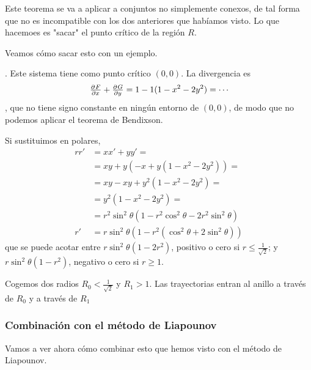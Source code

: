 Este teorema se va a aplicar a conjuntos no simplemente conexos, de tal forma que no es incompatible con los dos anteriores que habíamos visto. Lo que hacemoes es "sacar" el punto crítico de la región $R$.

Veamos cómo sacar esto con un ejemplo.

\begin{example}
. Este sistema tiene como punto crítico $(0,0)$. La divergencia es \[ \pd{F}{x} + \pd{G}{y} = 1 - 1(1-x^2-2y^2) = \cdots \], que no tiene signo constante en ningún entorno de $(0,0)$, de modo que no podemos aplicar el teorema de Bendixson.

Si sustituimos en polares, \begin{align*} rr' &= xx' + yy' = \\ &= xy + y(-x+y(1-x^2-2y^2)) = \\ &= xy-xy + y^2(1-x^2-2y^2) = \\ &= y^2(1-x^2-2y^2) = \\ &=
r^2\sin^2 θ (1-r^2\cos^2 θ -2r^2\sin^2 θ) \\ 
r' &= r\sin^2 θ(1-r^2(\cos^2θ + 2\sin^2θ )) \end{align*} que se puede acotar entre $r\sin^2 θ (1-2r^2)$, positivo o cero si $r ≤ \frac{1}{\sqrt{2}}$; y $r\sin^2θ (1-r^2)$, negativo o cero si $r≥ 1$.

Cogemos dos radios $R_0 < \frac{1}{\sqrt{2}}$ y $R_1 > 1$. Las trayectorias entran al anillo a través de $R_0$ y a través de $R_1$
\end{example}

\subsubsection{Combinación con el método de Liapounov}

Vamos a ver ahora cómo combinar esto que hemos visto con el método de Liapounov.

